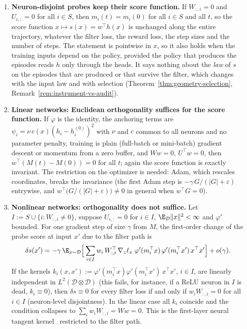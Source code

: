 \begin{theorem}\label{thm:geometry-training}
\leavevmode
\begin{enumerate}
  \item \textbf{Neuron-disjoint probes keep their score function.} If $W_{:,i} = 0$ and $U_{i,:} = 0$ for all $i \in S$, then $m_i(t) = m_i(0)$ for all $i \in S$ and all $t$, so the score function $x \mapsto s(x) = w^\top h(x)$ is unchanged along the entire trajectory, whatever the filter loss, the reward loss, the step sizes and the number of steps. The statement is pointwise in $x$, so it also holds when the training inputs depend on the policy, provided the policy that produces the episodes reads $h$ only through the heads. It says nothing about the \emph{law} of $s$ on the episodes that are produced or that survive the filter, which changes with the input law and with selection (Theorem~\ref{thm:geometry-selection}, Remark~\ref{rem:instrument-vs-audit}).
  \item \textbf{Linear networks: Euclidean orthogonality suffices for the score function.} If $\varphi$ is the identity, the anchoring terms are $\psi_i = \nu\, c(x)(h_i - h_i^{(0)})^2$ with $\nu$ and $c$ common to all neurons and no parameter penalty, training is plain (full-batch or mini-batch) gradient descent or momentum from a zero buffer, and $W w = 0$, $U^\top w = 0$, then $w^\top (M(t) - M(0)) = 0$ for all $t$; again the score function is exactly invariant. The restriction on the optimizer is needed: Adam, which rescales coordinates, breaks the invariance (the first Adam step is $-\gamma\,G/(|G|+\varepsilon)$ entrywise, and $w^\top\bigl(G/(|G|+\varepsilon)\bigr)\ne0$ in general when $w^\top G=0$).
  \item \textbf{Nonlinear networks: orthogonality does not suffice.} Let $I := S \cup \{i : W_{:,i} \neq 0\}$, suppose $U_{i,:} = 0$ for $i \in I$, $\E_{\mathcal{D}}\|x\|^2 < \infty$ and $\varphi'$ bounded. For one gradient step of size $\gamma$ from $M$, the first-order change of the probe score at input $x'$ due to the filter path is
  \begin{equation}\label{eq:ntk-drift}
    \delta s(x') = -\gamma\, \E_{x \sim \mathcal{D}}\Big[\sum_{i \in I} w_i\, W_{:,i}^\top\, \nabla_z \ell_x \; \varphi'(m_i^\top x)\, \varphi'(m_i^\top x')\, x^\top x'\Big] + o(\gamma).
  \end{equation}
  If the kernels $k_i(x, x') := \varphi'(m_i^\top x)\varphi'(m_i^\top x')\, x^\top x'$, $i \in I$, are linearly independent in $L^2(\mathcal{D} \otimes \mathcal{D})$ (this fails, for instance, if a ReLU neuron in $I$ is dead, $k_i \equiv 0$), then $\delta s \equiv 0$ for every filter loss if and only if $w_i W_{:,i} = 0$ for all $i \in I$ (neuron-level disjointness). In the linear case all $k_i$ coincide and the condition collapses to $\sum_i w_i W_{:,i} = W w = 0$. This is the first-layer neural tangent kernel~\cite{jacot2018} restricted to the filter path.

\end{enumerate}
\end{theorem}
